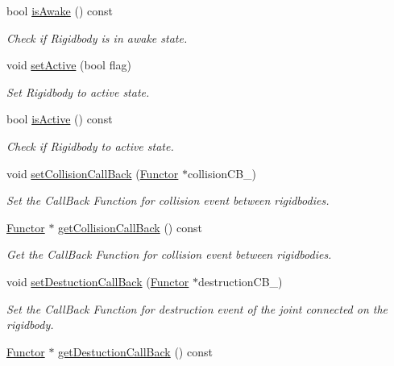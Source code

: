 \begin{DoxyCompactItemize}
bool \hyperlink{class_magnum_1_1_physics3_1_1_vehicle_a43bb4195748e32cf974e3f350a83c518}{is\+Awake} () const 
\begin{DoxyCompactList}\small\item\em Check if Rigidbody is in awake state. \end{DoxyCompactList}\item 
void \hyperlink{class_magnum_1_1_physics3_1_1_vehicle_a8658492c9ff18ab798cf4c64899968e3}{set\+Active} (bool flag)
\begin{DoxyCompactList}\small\item\em Set Rigidbody to active state. \end{DoxyCompactList}\item 
bool \hyperlink{class_magnum_1_1_physics3_1_1_vehicle_a819d0d84a23ff6be0fb5eae542411348}{is\+Active} () const 
\begin{DoxyCompactList}\small\item\em Check if Rigidbody to active state. \end{DoxyCompactList}\item 
void \hyperlink{class_magnum_1_1_physics3_1_1_vehicle_a14bada4d1d552aa636709a180bf126bf}{set\+Collision\+Call\+Back} (\hyperlink{class_magnum_1_1_functor}{Functor} $\ast$collision\+C\+B\+\_\+)
\begin{DoxyCompactList}\small\item\em Set the Call\+Back Function for collision event between rigidbodies. \end{DoxyCompactList}\item 
\hyperlink{class_magnum_1_1_functor}{Functor} $\ast$ \hyperlink{class_magnum_1_1_physics3_1_1_vehicle_a2264f2570a0ad9e288e7d71a6028ad2d}{get\+Collision\+Call\+Back} () const 
\begin{DoxyCompactList}\small\item\em Get the Call\+Back Function for collision event between rigidbodies. \end{DoxyCompactList}\item 
void \hyperlink{class_magnum_1_1_physics3_1_1_vehicle_a3b4378b291d4eb375b8c889aa6b99964}{set\+Destuction\+Call\+Back} (\hyperlink{class_magnum_1_1_functor}{Functor} $\ast$destruction\+C\+B\+\_\+)
\begin{DoxyCompactList}\small\item\em Set the Call\+Back Function for destruction event of the joint connected on the rigidbody. \end{DoxyCompactList}\item 
\hyperlink{class_magnum_1_1_functor}{Functor} $\ast$ \hyperlink{class_magnum_1_1_physics3_1_1_vehicle_a34d10492cff17017fbe150ce9cbe2c68}{get\+Destuction\+Call\+Back} () const 

\end{DoxyCompactItemize}
